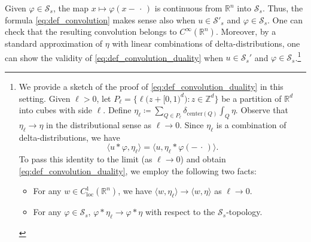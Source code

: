 \documentclass[10pt, reqno]{amsart}
\theoremstyle{plain}
\theoremstyle{remark}
\theoremstyle{definition}
\numberwithin{equation}{section}
\theoremstyle{plain}
\newcommand{\Z}{\ensuremath{\mathbb Z}} %
\newcommand{\R}{\ensuremath{\mathbb R}} %
\newcommand{\scalprod}[1]{\ensuremath{\langle #1\rangle}} %
\newcommand{\emptyparam}{\ensuremath{\,\cdot\,}}%
\newcommand{\defeq}{\ensuremath{\coloneqq}}%
\begin{document}
Given $\varphi\in\mathcal S_s$, the map $x\mapsto \varphi(x-\emptyparam)$ is continuous from $\R^n$ into $\mathcal S_s$. Thus, the formula \cref{eq:def_convolution} makes sense also when $u\in\mathcal S'_s$ and $\varphi\in\mathcal S_s$. One can check that the resulting convolution belongs to $C^\infty(\R^n)$.
Moreover, by a standard approximation of $\eta$ with linear combinations of delta-distributions, one can show the validity of \cref{eq:def_convolution_duality} when $u\in \mathcal S_s'$ and $\varphi\in\mathcal S_s$.\footnote{We provide a sketch of the proof of \cref{eq:def_convolution_duality} in this setting. Given $\ell>0$, let $P_\ell=\{\ell\big(z+[0,1)^d\big):z\in\Z^d\}$ be a partition of $\R^d$ into cubes with side $\ell$. Define $\eta_\ell\defeq \sum_{Q\in P_\ell} \delta_{\text{center}(Q)}\int_Q\eta$. Observe that $\eta_\ell\to \eta$ in the distributional sense as $\ell\to0$.
Since $\eta_\ell$ is a combination of delta-distributions, we have
\begin{equation*}
    \scalprod{u\ast\varphi, \eta_\ell}
    =
    \scalprod{u, \eta_\ell\ast \varphi(-\emptyparam)}.
\end{equation*}
To pass this identity to the limit (as $\ell\to 0$) and obtain \cref{eq:def_convolution_duality}, we employ the following two facts:
\begin{itemize}
    \item For any $w\in C^1_{\mathrm{loc}}(\R^n)$, we have $\scalprod{w, \eta_\ell}\to \scalprod{w, \eta}$ as $\ell\to 0$. 
    \item For any $\varphi\in \mathcal S_s$, $\varphi\ast\eta_\ell \to \varphi\ast\eta$ with respect to the $\mathcal S_s$-topology.
\end{itemize}
}%
\end{document}
